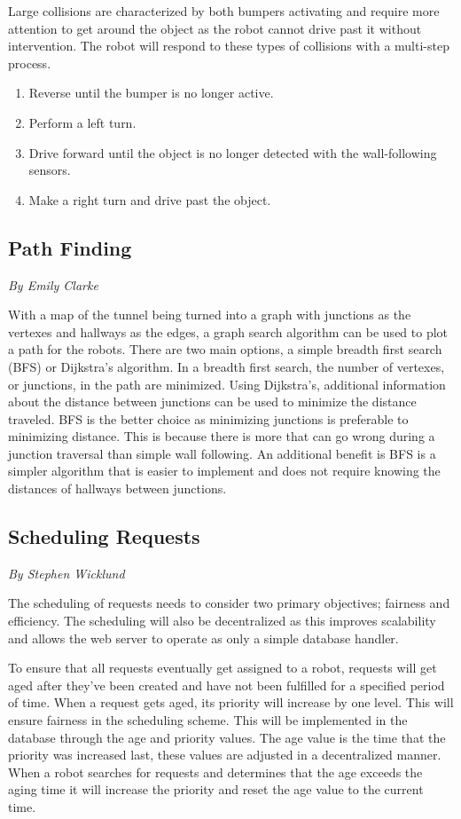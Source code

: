 \documentclass[12pt]{report}
\newcommand{\sectionAuthor}[1]{{\small\vspace{-1em}\textit{#1}}\bigskip\par}
\begin{document}
Large collisions are characterized by both bumpers activating and require more attention to get around the object as the robot cannot drive past it without intervention. The robot will respond to these types of collisions with a multi-step process.

\begin{enumerate}
\itemsep0em 
    \item Reverse until the bumper is no longer active.
    \item Perform a left turn.
    \item Drive forward until the object is no longer detected with the wall-following sensors.
    \item Make a right turn and drive past the object.
\end{enumerate}

\subsection{Path Finding}
\sectionAuthor{By Emily Clarke}
With a map of the tunnel being turned into a graph with junctions as the vertexes and hallways as the edges, a graph search algorithm can be used to plot a path for the robots. There are two main options, a simple breadth first search (BFS) or Dijkstra's algorithm. In a breadth first search, the number of vertexes, or junctions, in the path are minimized. Using Dijkstra's, additional information about the distance between junctions can be used to minimize the distance traveled. 
BFS is the better choice as minimizing junctions is preferable to minimizing distance. This is because there is more that can go wrong during a junction traversal than simple wall following. An additional benefit is BFS is a simpler algorithm that is easier to implement and does not require knowing the distances of hallways between junctions.

\subsection{Scheduling Requests}
\sectionAuthor{By Stephen Wicklund}
\label{SchedulingRequests}
The scheduling of requests needs to consider two primary objectives; fairness and efficiency. The scheduling will also be decentralized as this improves scalability and allows the web server to operate as only a simple database handler.

To ensure that all requests eventually get assigned to a robot, requests will get aged after they've been created and have not been fulfilled for a specified period of time. When a request gets aged, its priority will increase by one level. This will ensure fairness in the scheduling scheme. This will be implemented in the database through the age and priority values. The age value is the time that the priority was increased last, these values are adjusted in a decentralized manner. When a robot searches for requests and determines that the age exceeds the aging time it will increase the priority and reset the age value to the current time.
\end{document}
